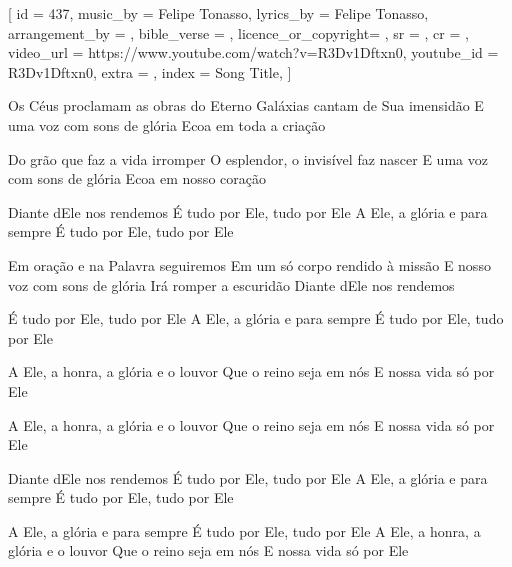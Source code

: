 [
    id                  = {437},
    music_by            = {Felipe Tonasso}, %
    lyrics_by           = {Felipe Tonasso}, %
    arrangement_by      = {}, %
    bible_verse         = {},
    licence_or_copyright= {},
    sr                  = {},
    cr                  = {},
    video_url           = {https://www.youtube.com/watch?v=R3Dv1Dftxn0}, %
    youtube_id          = {R3Dv1Dftxn0}, %
    extra               = {},
    index               = {Song Title},
]

\beginverse
Os Céus proclamam as obras do Eterno
Galáxias cantam de Sua imensidão
E uma voz com sons de glória
Ecoa em toda a criação
\endverse

\beginverse
Do grão que faz a vida irromper
O esplendor, o invisível faz nascer
E uma voz com sons de glória
Ecoa em nosso coração
\endverse

\beginverse
Diante dEle nos rendemos
É tudo por Ele, tudo por Ele
A Ele, a glória e para sempre
É tudo por Ele, tudo por Ele
\endverse

\beginverse
Em oração e na Palavra seguiremos
Em um só corpo rendido à missão
E nosso voz com sons de glória
Irá romper a escuridão
Diante dEle nos rendemos
\endverse

\beginverse
É tudo por Ele, tudo por Ele
A Ele, a glória e para sempre
É tudo por Ele, tudo por Ele
\endverse

\beginverse
A Ele, a honra, a glória e o louvor
Que o reino seja em nós
E nossa vida só por Ele

A Ele, a honra, a glória e o louvor
Que o reino seja em nós
E nossa vida só por Ele
\endverse

\beginverse
Diante dEle nos rendemos
É tudo por Ele, tudo por Ele
A Ele, a glória e para sempre
É tudo por Ele, tudo por Ele
\endverse

\beginverse
A Ele, a glória e para sempre
É tudo por Ele, tudo por Ele
A Ele, a honra, a glória e o louvor
Que o reino seja em nós
E nossa vida só por Ele
\endverse

\beginchorus

\endchorus

\endsong
